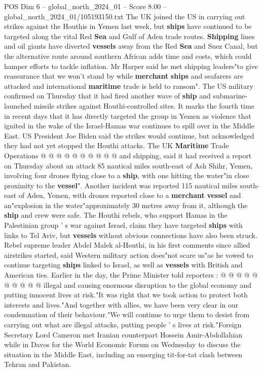 \begin{textsample}{POS Dim 6 – global\_north\_2024\_01 – Score 8.00 – global\_north\_2024\_01/105193150.txt}  \label{ex:f6_pos_112}
The UK joined the US in carrying out strikes against the Houthis in Yemen last week, but \textbf{ships} have continued to be targeted along the vital Red \textbf{Sea} and Gulf of Aden trade routes. \textbf{Shipping} lines and oil giants have diverted \textbf{vessels} away from the Red \textbf{Sea} and Suez Canal, but the alternative route around southern African adds time and costs, which could hamper efforts to tackle inflation.
Mr Harper said he met shipping leaders"to give reassurance that we won't stand by while \textbf{merchant} \textbf{ships} and seafarers are attacked and international \textbf{maritime} trade is held to ransom".
The US military confirmed on Thursday that it had fired another wave of \textbf{ship} and submarine-launched missile strikes against Houthi-controlled sites.
It marks the fourth time in recent days that it has directly targeted the group in Yemen as violence that ignited in the wake of the Israel-Hamas war continues to spill over in the Middle East.
US President Joe Biden said the strikes would continue, but acknowledged they had not yet stopped the Houthi attacks.
The UK \textbf{Maritime} Trade Operations @ @ @ @ @ @ @ @ @ @ and shipping, said it had received a report on Thursday about an attack 85 nautical miles south-east of Ash Shihr, Yemen, involving four drones flying close to a \textbf{ship}, with one hitting the water"in close proximity to the \textbf{vessel}".
Another incident was reported 115 nautical miles south-east of Aden, Yemen, with drones reported close to a \textbf{merchant} \textbf{vessel} and an"explosion in the water"approximately 30 metres away from it, although the \textbf{ship} and crew were safe.
The Houthi rebels, who support Hamas in the Palestinian group ' s war against Israel, claim they have targeted \textbf{ships} with links to Tel Aviv, but \textbf{vessels} without obvious connections have also been struck.
Rebel supreme leader Abdel Malek al-Houthi, in his first comments since allied airstrikes started, said Western military action does"not scare us"as he vowed to continue targeting \textbf{ships} linked to Israel, as well as \textbf{vessels} with British and American ties.
Earlier in the day, the Prime Minister told reporters : @ @ @ @ @ @ @ @ @ @ illegal and causing enormous disruption to the global economy and putting innocent lives at risk."It was right that we took action to protect both interests and lives."And together with allies, we have been very clear in our condemnation of their behaviour."We will continue to urge them to desist from carrying out what are illegal attacks, putting people ' s lives at risk."Foreign Secretary Lord Cameron met Iranian counterpart Hossein Amir-Abdollahian while in Davos for the World Economic Forum on Wednesday to discuss the situation in the Middle East, including an emerging tit-for-tat clash between Tehran and Pakistan.

\end{textsample}
